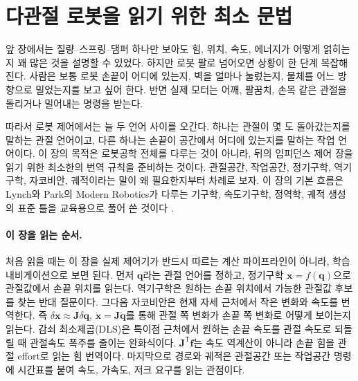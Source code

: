 \section{다관절 로봇을 읽기 위한 최소 문법}
\label{sec:robotics-foundations}

앞 장에서는 질량--스프링--댐퍼 하나만 보아도 힘, 위치, 속도, 에너지가 어떻게 얽히는지 꽤 많은 것을 설명할 수 있었다.
하지만 로봇 팔로 넘어오면 상황이 한 단계 복잡해진다.
사람은 보통 로봇 손끝이 어디에 있는지, 벽을 얼마나 눌렀는지, 물체를 어느 방향으로 밀었는지를 보고 싶어 한다.
반면 실제 모터는 어깨, 팔꿈치, 손목 같은 관절을 돌리거나 밀어내는 명령을 받는다.

따라서 로봇 제어에서는 늘 두 언어 사이를 오간다.
하나는 관절이 몇 도 돌아갔는지를 말하는 관절 언어이고, 다른 하나는 손끝이 공간에서 어디에 있는지를 말하는 작업 언어이다.
이 장의 목적은 로봇공학 전체를 다루는 것이 아니라, 뒤의 임피던스 제어 장을 읽기 위한 최소한의 번역 규칙을 준비하는 것이다.
관절공간, 작업공간, 정기구학, 역기구학, 자코비안, 궤적이라는 말이 왜 필요한지부터 차례로 보자.
이 장의 기본 흐름은 Lynch와 Park의 Modern Robotics가 다루는 기구학, 속도기구학, 정역학, 궤적 생성의 표준 틀을 교육용으로 풀어 쓴 것이다 \cite{lynchpark2017modernrobotics}.

\paragraph{이 장을 읽는 순서.}
%
처음 읽을 때는 이 장을 실제 제어기가 반드시 따르는 계산 파이프라인이 아니라, 학습 내비게이션으로 보면 된다.
%
%
먼저 \(\bm{q}\)라는 관절 언어를 정하고, 정기구학 \(\bm{x}=f(\bm{q})\)으로 관절값에서 손끝 위치를 읽는다.
%
역기구학은 원하는 손끝 위치에서 가능한 관절값 후보를 찾는 반대 질문이다.
그다음 자코비안은 현재 자세 근처에서 작은 변화와 속도를 번역한다.
%
즉 \(\delta\bm{x}\approx\bm{J}\delta\bm{q}\), \(\dot{\bm{x}}=\bm{J}\dot{\bm{q}}\)를 통해 관절 쪽 변화가 손끝 쪽 변화로 어떻게 보이는지 읽는다.
감쇠 최소제곱(DLS)은 특이점 근처에서 원하는 손끝 속도를 관절 속도로 되돌릴 때 관절속도 폭주를 줄이는 완화식이다.
%
%
\(\bm{J}^{\mathsf{T}}\bm{f}\)는 속도 역계산이 아니라 손끝 힘을 관절 effort로 읽는 힘 번역이다.
%
마지막으로 경로와 궤적은 관절공간 또는 작업공간 명령에 시간표를 붙여 속도, 가속도, 저크 요구를 읽는 관점이다.
%


